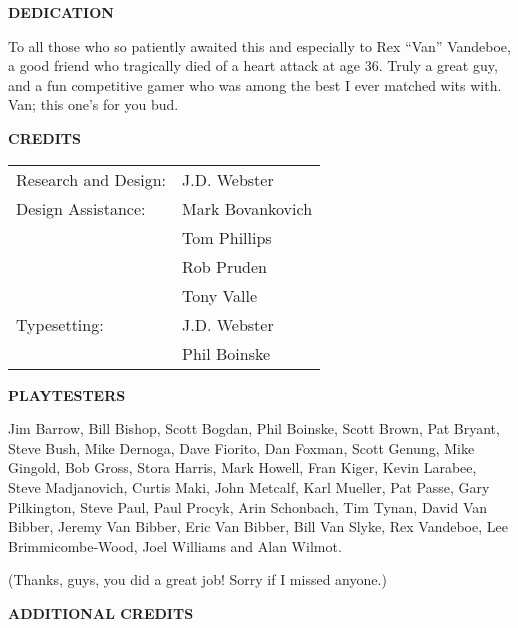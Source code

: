 \begin{multicols}{2}

\begin{center}
\textbf{DEDICATION}
\end{center}

To all those who so patiently awaited this and especially to Rex “Van” Vandeboe, a good friend who tragically died of a heart attack at age 36. Truly a great guy, and a fun competitive gamer who was among the best I ever matched wits with. Van; this one’s for you bud.

\begin{center}
\textbf{CREDITS}
\end{center}

\begin{tabular}{@{}p{4cm}p{4cm}}
Research and Design: &J.D. Webster\\
Design Assistance:   &Mark Bovankovich\\
                     &Tom Phillips\\
                     &Rob Pruden\\
                     &Tony Valle\\
Typesetting:         &J.D. Webster\\
                     &Phil Boinske\\
\end{tabular}

\begin{center}
\textbf{PLAYTESTERS}
\end{center}

Jim Barrow, Bill Bishop, Scott Bogdan, Phil Boinske, Scott Brown, Pat Bryant, Steve Bush, Mike Dernoga, Dave Fiorito, Dan Foxman, Scott Genung, Mike Gingold, Bob Gross, Stora Harris, Mark Howell, Fran Kiger, Kevin Larabee, Steve Madjanovich, Curtis Maki, John Metcalf, Karl Mueller, Pat Passe, Gary Pilkington, Steve Paul, Paul Procyk, Arin Schonbach, Tim Tynan, David Van Bibber, Jeremy Van Bibber, Eric Van Bibber, Bill Van Slyke, Rex Vandeboe, Lee Brimmicombe-Wood, Joel Williams and Alan Wilmot.

(Thanks, guys, you did a great job! Sorry if I missed anyone.)

\begin{center}
\textbf{ADDITIONAL CREDITS}
\end{center}


\end{multicols}
